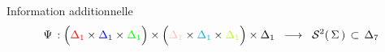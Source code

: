 \begin{frame}{\vskip -0.2cm \LARGE Information additionnelle}
\scriptsize
\begin{equation*}
\Psi \, :
\left({\color{red}\Delta_{1}} \overset{{\color{white}.}}{\times} {\color{blue}\Delta_{1}} \times {\color{green}\Delta_{1}}\right)
\times
\left({\color{pink}\Delta_{1}} \overset{{\color{white}.}}{\times} {\color{cyan}\Delta_{1}} \times {\color{lime}\Delta_{1}}\right)
\times
\Delta_{1}
\;\;\longrightarrow\;\;
\mathcal{S}^{2}\!\left(\,\Sigma\,\right) \,\subset\, \Delta_{7}
\end{equation*}

\end{frame}
\normalsize

